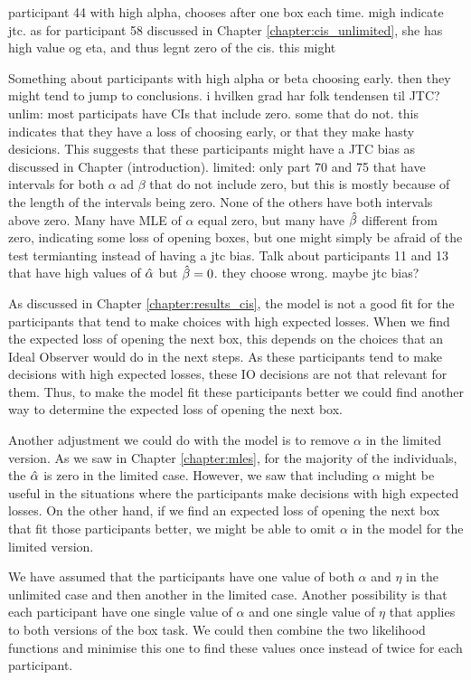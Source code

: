 participant 44 with high alpha, chooses after one box each time. migh indicate jtc. as for participant 58 discussed in Chapter \ref{chapter:cis_unlimited}, she has high value og eta, and thus legnt zero of the cis. this might 

Something about participants with high alpha or beta choosing early. then they might tend to jump to conclusions. i hvilken grad har folk tendensen til JTC? 
unlim: most participats have CIs that include zero. some that do not. this indicates that they have a loss of choosing early, or that they make hasty desicions. This suggests that these participants might have a JTC bias as discussed in Chapter (introduction). 
limited: only part 70 and 75 that have intervals for both $\alpha$ ad $\beta$ that do not include zero, but this is mostly because of the length of the intervals being zero. None of the others have both intervals above zero. Many have MLE of $\alpha$ equal zero, but many have $\hat{\beta}$ different from zero, indicating some loss of opening boxes, but one might simply be afraid of the test termianting instead of having a jtc bias.
Talk about participants 11 and 13 that have high values of $\hat{\alpha}$ but $\hat{\beta}=0$. they choose wrong. maybe jtc bias? 


As discussed in Chapter \ref{chapter:results_cis}, the model is not a good fit for the participants that tend to make choices with high expected losses. When we find the expected loss of opening the next box, this depends on the choices that an Ideal Observer would do in the next steps. As these participants tend to make decisions with high expected losses, these IO decisions are not that relevant for them. Thus, to make the model fit these participants better we could find another way to determine the expected loss of opening the next box. 

Another adjustment we could do with the model is to remove $\alpha$ in the limited version. As we saw in Chapter \ref{chapter:mles},
for the majority of the individuals, the $\hat{\alpha}$ is zero in the limited case. However, we saw that including $\alpha$ might be useful in the situations where the participants make decisions with high expected losses. On the other hand, if we find an expected loss of opening the next box that fit those participants better, we might be able to omit $\alpha$ in the model for the limited version.

We have assumed that the participants have one value of both $\alpha$ and $\eta$ in the unlimited case and then another in the limited case. Another possibility is that each participant have one single value of $\alpha$ and one single value of $\eta$ that applies to both versions of the box task. We could then combine the two likelihood functions and minimise this one to find these values once instead of twice for each participant. 

